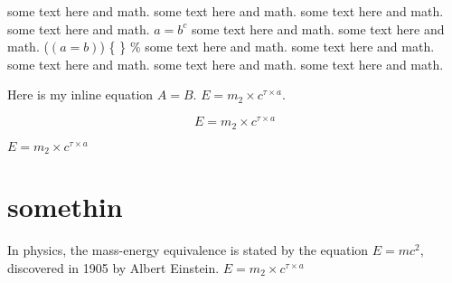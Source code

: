 \documentclass[12pt, letterpaper]{article}
\begin{document}
some text here and math. some text here and math. some text here and math. some text here and math. $a=b^c$ some text here and math. some text here and math. (\((a=b)\)) \{ \} \%  
some text here and math. some text here and math. some text here and math. some text here and math. some text here and math. 

\par



Here is my inline equation $A=B$. \( E=m_2 \times c ^{\tau \times a} \). 

\[ E=m_2 \times c ^{\tau \times a} \]



\begin{math}
    E=m_2 \times c ^{\tau \times a}
\end{math}

\section{somethin}

In physics, the mass-energy equivalence is stated 
by the equation $E=mc^2$, discovered in 1905 by Albert Einstein.
\begin{math}
    E=m_2 \times c ^{\tau \times a}
\end{math}
\end{document}
